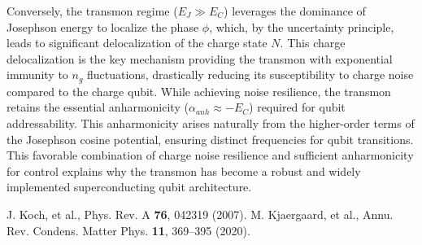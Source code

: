 \documentclass[12pt]{article}
\begin{document}
Conversely, the transmon regime ($E_J \gg E_C$) leverages the dominance of Josephson energy to localize the phase $\phi$, which, by the uncertainty principle, leads to significant delocalization of the charge state $N$. This charge delocalization is the key mechanism providing the transmon with exponential immunity to $n_g$ fluctuations, drastically reducing its susceptibility to charge noise compared to the charge qubit. %
While achieving noise resilience, the transmon retains the essential anharmonicity ($\alpha_{anh} \approx -E_C$) required for qubit addressability. This anharmonicity arises naturally from the higher-order terms of the Josephson cosine potential, ensuring distinct frequencies for qubit transitions. %
This favorable combination of charge noise resilience and sufficient anharmonicity for control explains why the transmon has become a robust and widely implemented superconducting qubit architecture. %


\begin{thebibliography}{9}
    J. Koch, et al., Phys. Rev. A \textbf{76}, 042319 (2007).
    M. Kjaergaard, et al., Annu. Rev. Condens. Matter Phys. \textbf{11}, 369–395 (2020).
\end{thebibliography}
\end{document}
